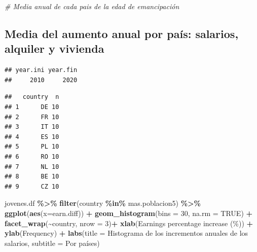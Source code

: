 \documentclass[water,article,submit,pdftex,moreauthors]{Definitions/mdpi}
\newenvironment{Shaded}{\begin{snugshade}}{\end{snugshade}}
\newcommand{\AttributeTok}[1]{\textcolor[rgb]{0.13,0.29,0.53}{#1}}
\newcommand{\CommentTok}[1]{\textcolor[rgb]{0.56,0.35,0.01}{\textit{#1}}}
\newcommand{\ConstantTok}[1]{\textcolor[rgb]{0.56,0.35,0.01}{#1}}
\newcommand{\DecValTok}[1]{\textcolor[rgb]{0.00,0.00,0.81}{#1}}
\newcommand{\FunctionTok}[1]{\textcolor[rgb]{0.13,0.29,0.53}{\textbf{#1}}}
\newcommand{\NormalTok}[1]{#1}
\newcommand{\SpecialCharTok}[1]{\textcolor[rgb]{0.81,0.36,0.00}{\textbf{#1}}}
\newcommand{\StringTok}[1]{\textcolor[rgb]{0.31,0.60,0.02}{#1}}
\begin{document}
\begin{Shaded}
\begin{Highlighting}[]
\CommentTok{\# Media anual de cada pais de la edad de emancipación}
\end{Highlighting}
\end{Shaded}

\subsection{Media del aumento anual por país: salarios, alquiler y
vivienda}\label{media-del-aumento-anual-por-pauxeds-salarios-alquiler-y-vivienda}

\begin{verbatim}
## year.ini year.fin 
##     2010     2020
\end{verbatim}

\begin{verbatim}
##   country  n
## 1      DE 10
## 2      FR 10
## 3      IT 10
## 4      ES 10
## 5      PL 10
## 6      RO 10
## 7      NL 10
## 8      BE 10
## 9      CZ 10
\end{verbatim}

\begin{Shaded}
\begin{Highlighting}[]
\NormalTok{jovenes.df }\SpecialCharTok{\%\textgreater{}\%} \FunctionTok{filter}\NormalTok{(country }\SpecialCharTok{\%in\%}\NormalTok{ mas.poblacion5) }\SpecialCharTok{\%\textgreater{}\%} \FunctionTok{ggplot}\NormalTok{(}\FunctionTok{aes}\NormalTok{(}\AttributeTok{x=}\NormalTok{earn.diff)) }\SpecialCharTok{+}  \FunctionTok{geom\_histogram}\NormalTok{(}\AttributeTok{bins =} \DecValTok{30}\NormalTok{, }\AttributeTok{na.rm =} \ConstantTok{TRUE}\NormalTok{) }\SpecialCharTok{+} \FunctionTok{facet\_wrap}\NormalTok{(}\SpecialCharTok{\textasciitilde{}}\NormalTok{country, }\AttributeTok{nrow =} \DecValTok{3}\NormalTok{)}\SpecialCharTok{+} \FunctionTok{xlab}\NormalTok{(}\StringTok{\textquotesingle{}Earnings percentage increase (\%)\textquotesingle{}}\NormalTok{) }\SpecialCharTok{+} \FunctionTok{ylab}\NormalTok{(}\StringTok{\textquotesingle{}Frequency\textquotesingle{}}\NormalTok{) }\SpecialCharTok{+} \FunctionTok{labs}\NormalTok{(}\AttributeTok{title =} \StringTok{\textquotesingle{}Histograma de los incrementos anuales de los salarios\textquotesingle{}}\NormalTok{, }\AttributeTok{subtitle =} \StringTok{\textquotesingle{}Por países\textquotesingle{}}\NormalTok{)}
\end{Highlighting}
\end{Shaded}
\end{document}
